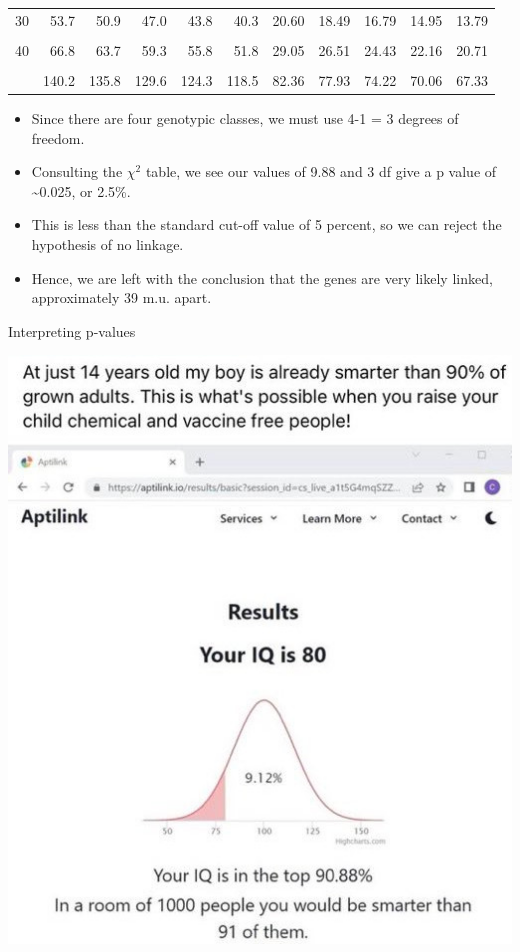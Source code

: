 \documentclass[11pt,ignorenonframetext,aspectratio=169]{beamer}
\providecommand{\tightlist}{%
  \setlength{\itemsep}{0pt}\setlength{\parskip}{0pt}}
\begin{document}
\begin{frame}{}
\begin{table}
\begin{tabular}[t]{lrrrr|>{}rrrrrr}
30 & 53.7 & 50.9 & 47.0 & 43.8 & 40.3 & 20.60 & 18.49 & 16.79 & 14.95 & 13.79\\
\cellcolor{gray!6}{35} & \cellcolor{gray!6}{60.3} & \cellcolor{gray!6}{57.3} & \cellcolor{gray!6}{53.2} & \cellcolor{gray!6}{49.8} & \cellcolor{gray!6}{46.1} & \cellcolor{gray!6}{24.80} & \cellcolor{gray!6}{22.47} & \cellcolor{gray!6}{20.57} & \cellcolor{gray!6}{18.51} & \cellcolor{gray!6}{17.19}\\
40 & 66.8 & 63.7 & 59.3 & 55.8 & 51.8 & 29.05 & 26.51 & 24.43 & 22.16 & 20.71\\
\cellcolor{gray!6}{50} & \cellcolor{gray!6}{79.5} & \cellcolor{gray!6}{76.2} & \cellcolor{gray!6}{71.4} & \cellcolor{gray!6}{67.5} & \cellcolor{gray!6}{63.2} & \cellcolor{gray!6}{37.69} & \cellcolor{gray!6}{34.76} & \cellcolor{gray!6}{32.36} & \cellcolor{gray!6}{29.71} & \cellcolor{gray!6}{27.99}\\
\addlinespace
100 & 140.2 & 135.8 & 129.6 & 124.3 & 118.5 & 82.36 & 77.93 & 74.22 & 70.06 & 67.33\\
\bottomrule
\end{tabular}
\end{table}
\end{frame}

\begin{frame}{}
\protect\hypertarget{section-5}{}
\begin{itemize}
\tightlist
\item
  Since there are four genotypic classes, we must use 4-1 = 3 degrees of
  freedom.
\item
  Consulting the \(\chi^2\) table, we see our values of 9.88 and 3 df
  give a p value of \textasciitilde0.025, or 2.5\%.
\item
  This is less than the standard cut-off value of 5 percent, so we can
  reject the hypothesis of no linkage.
\item
  Hence, we are left with the conclusion that the genes are very likely
  linked, approximately 39 m.u. apart.
\end{itemize}
\end{frame}

\begin{frame}{Interpreting p-values}
\protect\hypertarget{interpreting-p-values}{}
\begin{center}\includegraphics[width=0.4\linewidth]{../images/interpreting_pvalues} \end{center}
\end{frame}
\end{document}
